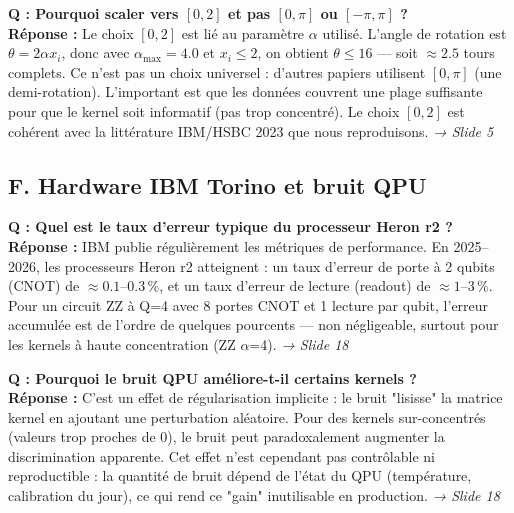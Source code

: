 \documentclass[12pt, a4paper]{article}
\begin{document}
\begin{question}
\textbf{Q : Pourquoi scaler vers $[0, 2]$ et pas $[0, \pi]$ ou $[-\pi, \pi]$ ?}\\[4pt]
\textbf{Réponse :} Le choix $[0, 2]$ est lié au paramètre $\alpha$ utilisé.
L'angle de rotation est $\theta = 2\alpha x_i$, donc avec $\alpha_{\max}=4.0$ et $x_i \leq 2$,
on obtient $\theta \leq 16$ — soit $\approx 2.5$ tours complets.
Ce n'est pas un choix universel : d'autres papiers utilisent $[0, \pi]$ (une demi-rotation).
L'important est que les données couvrent une plage suffisante pour que le kernel
soit informatif (pas trop concentré). Le choix $[0, 2]$ est cohérent avec la littérature
IBM/HSBC 2023 que nous reproduisons.
\hfill\textit{→ Slide 5}
\end{question}

\subsection*{F. Hardware IBM Torino et bruit QPU}

\begin{question}
\textbf{Q : Quel est le taux d'erreur typique du processeur Heron r2 ?}\\[4pt]
\textbf{Réponse :} IBM publie régulièrement les métriques de performance.
En 2025--2026, les processeurs Heron r2 atteignent :
un taux d'erreur de porte à 2 qubits (CNOT) de $\approx 0.1$--0.3\,\%,
et un taux d'erreur de lecture (readout) de $\approx 1$--3\,\%.
Pour un circuit ZZ à Q=4 avec 8 portes CNOT et 1 lecture par qubit,
l'erreur accumulée est de l'ordre de quelques pourcents — non négligeable,
surtout pour les kernels à haute concentration (ZZ $\alpha$=4).
\hfill\textit{→ Slide 18}
\end{question}

\begin{question}
\textbf{Q : Pourquoi le bruit QPU améliore-t-il certains kernels ?}\\[4pt]
\textbf{Réponse :} C'est un effet de régularisation implicite :
le bruit "lisisse" la matrice kernel en ajoutant une perturbation aléatoire.
Pour des kernels sur-concentrés (valeurs trop proches de 0), le bruit
peut paradoxalement augmenter la discrimination apparente.
Cet effet n'est cependant pas contrôlable ni reproductible :
la quantité de bruit dépend de l'état du QPU (température, calibration du jour),
ce qui rend ce "gain" inutilisable en production.
\hfill\textit{→ Slide 18}
\end{question}
\end{document}
